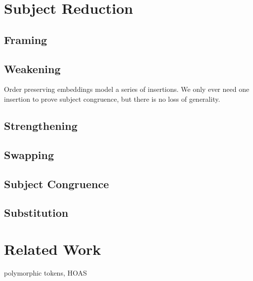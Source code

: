 \documentclass[a4paper,UKenglish,cleveref, autoref, thm-restate,authorcolumns]{lipics-v2019}
\theoremstyle{definition}
\begin{document}
\section{Subject Reduction}\label{subject-reduction}

\subsection{Framing}


\subsection{Weakening}

Order preserving embeddings model a series of insertions. We only ever need one insertion to prove subject congruence, but there is no loss of generality.

\subsection{Strengthening}

\subsection{Swapping}

\subsection{Subject Congruence}\label{subject-congruence}

\subsection{Substitution}

\section{Related Work}

\cite{previous-work} polymorphic tokens, HOAS

\cite{typing-with-leftovers}

\cite{Higher-inductive-types-for-congruence}

\cite{LTS-semantics}

\cite{work-on-session-types}


\end{document}
